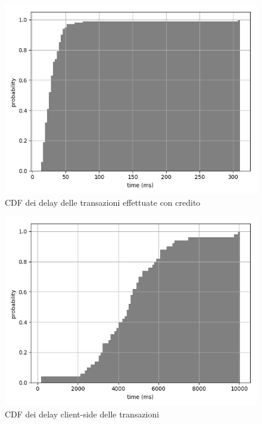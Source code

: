 \begin{figure}[h!t]
\centerline{\includegraphics[width=\textwidth]{img/instant-buy-delay-grey}}
\caption{CDF dei delay delle transazioni effettuate con credito}
\label{f:calcoli:instant}
\end{figure}

\begin{figure}[h!t]
\centerline{\includegraphics[width=\textwidth]{img/client-side-delay-grey}}
\caption{CDF dei delay client-side delle transazioni}
\label{f:calcoli:client}
\end{figure}